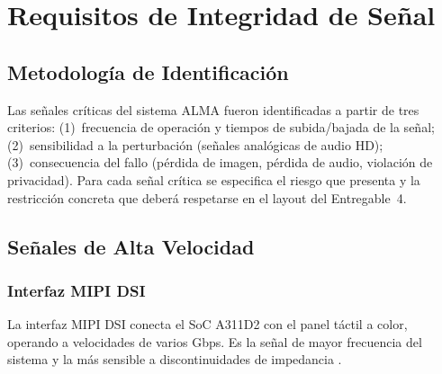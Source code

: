 \chapter{Requisitos de Integridad de Señal}
\label{chap:si}

\section{Metodología de Identificación}
\label{sec:si_metodologia}

Las señales críticas del sistema ALMA fueron identificadas a partir de tres criterios:
(1)~frecuencia de operación y tiempos de subida/bajada de la señal;
(2)~sensibilidad a la perturbación (señales analógicas de audio HD);
(3)~consecuencia del fallo (pérdida de imagen, pérdida de audio, violación de
privacidad). Para cada señal crítica se especifica el riesgo que presenta y la
restricción concreta que deberá respetarse en el layout del Entregable~4.

\section{Señales de Alta Velocidad}
\label{sec:si_alta_velocidad}

\subsection{Interfaz MIPI DSI}
\label{subsec:si_mipi}

La interfaz MIPI DSI conecta el SoC A311D2 con el panel táctil a color, operando
a velocidades de varios Gbps. Es la señal de mayor frecuencia del sistema y la
más sensible a discontinuidades de impedancia .

